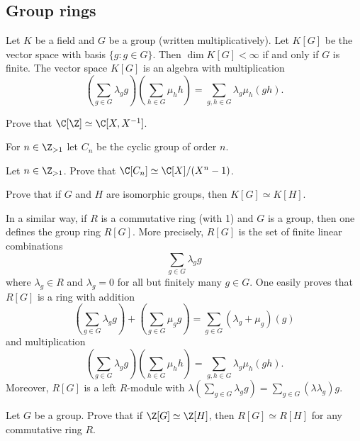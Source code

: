 \section{}

\subsection{Group rings}

Let $K$ be a field and $G$ be a group (written multiplicatively). Let $K[G]$ be the 
vector space with basis $\{g:g\in G\}$. Then $\dim K[G]<\infty$ if and only if $G$ 
is finite. The vector space $K[G]$ is an algebra
with multiplication
\[
\left(\sum_{g\in G}\lambda_gg\right)\left(\sum_{h\in G}\mu_hh\right)
=\sum_{g,h\in G}\lambda_g\mu_h(gh).
\]

\begin{exercise}
    Prove that $\C[\Z]\simeq\C[X,X^{-1}]$. 
\end{exercise}

For $n\in\Z_{>1}$
let $C_n$ be the cyclic group of order $n$.
    
\begin{exercise}
    Let $n\in\Z_{>1}$. Prove that $\C[C_n]\simeq\C[X]/(X^n-1)$. 
\end{exercise}

\begin{exercise}
    Prove that if $G$ and $H$ are isomorphic groups, then $K[G]\simeq K[H]$. 
\end{exercise}

In a similar way, if $R$ is a commutative ring (with 1) 
and $G$ is a group, then one defines the group ring $R[G]$. More precisely,
$R[G]$ is the set of finite linear combinations
\[
    \sum_{g\in G}\lambda_gg
\]
where $\lambda_g\in R$ and $\lambda_g=0$ for all but finitely many $g\in G$. 
One easily proves that $R[G]$ is a ring with 
addition
\[
\left(\sum_{g\in G}\lambda_gg\right)+\left(\sum_{g\in G}\mu_gg\right)
=\sum_{g\in G}(\lambda_g+\mu_g)(g)
\]
and multiplication 
\[
\left(\sum_{g\in G}\lambda_gg\right)\left(\sum_{h\in G}\mu_hh\right)
=\sum_{g,h\in G}\lambda_g\mu_h(gh).
\]
Moreover, $R[G]$ is a left $R$-module with
$\lambda(\sum_{g\in G}\lambda_gg)=\sum_{g\in G}(\lambda\lambda_g)g$. 

\begin{exercise}
    Let $G$ be a group. Prove that if 
    $\Z[G]\simeq\Z[H]$, then $R[G]\simeq R[H]$ for any commutative ring $R$.      
\end{exercise}

